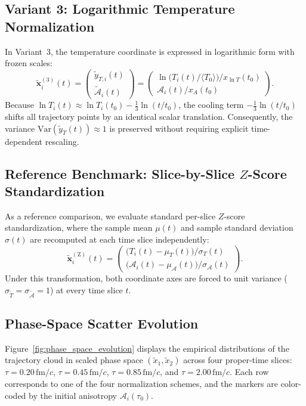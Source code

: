 \documentclass[11pt,a4paper]{article}
\begin{document}
\subsection{Variant 3: Logarithmic Temperature Normalization}
In Variant~3, the temperature coordinate is expressed in logarithmic form with frozen scales:
\begin{equation}
    \tilde{\mathbf{x}}_i^{(3)}(t) = \begin{pmatrix} \tilde{y}_{T, i}(t) \\ \tilde{\mathcal{A}}_i(t) \end{pmatrix} = \begin{pmatrix} \ln\big(T_i(t)/\langle T_0 \rangle\big) / x_{\ln T}(t_0) \\ \mathcal{A}_i(t) / x_A(t_0) \end{pmatrix}.
    \label{eq:var3_def}
\end{equation}
Because $\ln T_i(t) \approx \ln T_i(t_0) - \frac{1}{3}\ln(t/t_0)$, the cooling term $-\frac{1}{3}\ln(t/t_0)$ shifts all trajectory points by an identical scalar translation. Consequently, the variance $\mathrm{Var}(\tilde{y}_T(t)) \approx 1$ is preserved without requiring explicit time-dependent rescaling.

\subsection{Reference Benchmark: Slice-by-Slice \texorpdfstring{$Z$}{Z}-Score Standardization}
As a reference comparison, we evaluate standard per-slice $Z$-score standardization, where the sample mean $\mu(t)$ and sample standard deviation $\sigma(t)$ are recomputed at each time slice independently:
\begin{equation}
    \tilde{\mathbf{x}}_i^{(\mathrm{Z})}(t) = \begin{pmatrix} \big(T_i(t) - \mu_T(t)\big) / \sigma_T(t) \\ \big(\mathcal{A}_i(t) - \mu_{\mathcal{A}}(t)\big) / \sigma_{\mathcal{A}}(t) \end{pmatrix}.
    \label{eq:zscore_def}
\end{equation}
Under this transformation, both coordinate axes are forced to unit variance ($\sigma_{\tilde{T}} = \sigma_{\tilde{\mathcal{A}}} = 1$) at every time slice $t$.

\subsection{Phase-Space Scatter Evolution}
Figure~\ref{fig:phase_space_evolution} displays the empirical distributions of the trajectory cloud in scaled phase space $(\tilde{x}_1, \tilde{x}_2)$ across four proper-time slices: $\tau = 0.20\,\mathrm{fm}/c$, $\tau = 0.45\,\mathrm{fm}/c$, $\tau = 0.85\,\mathrm{fm}/c$, and $\tau = 2.00\,\mathrm{fm}/c$. Each row corresponds to one of the four normalization schemes, and the markers are color-coded by the initial anisotropy $\mathcal{A}_i(\tau_0)$.
\end{document}
